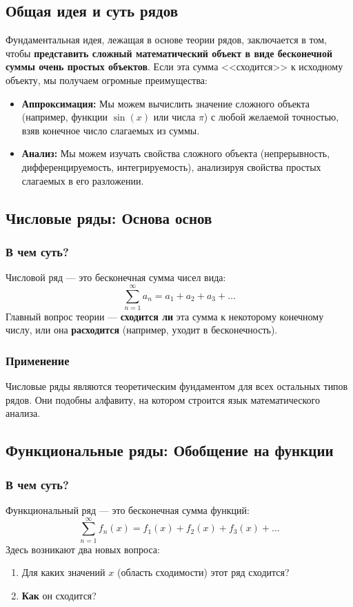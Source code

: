 \documentclass[a4paper, 12pt]{report}
\date{}
\numberwithin{equation}{section}
\begin{document}
\subsection{Общая идея и суть рядов}

Фундаментальная идея, лежащая в основе теории рядов, заключается в том, чтобы \textbf{представить сложный математический объект в виде бесконечной суммы очень простых объектов}. Если эта сумма <<сходится>> к исходному объекту, мы получаем огромные преимущества:
\begin{itemize}
	\item \textbf{Аппроксимация:} Мы можем вычислить значение сложного объекта (например, функции $\sin(x)$ или числа $\pi$) с любой желаемой точностью, взяв конечное число слагаемых из суммы.
	\item \textbf{Анализ:} Мы можем изучать свойства сложного объекта (непрерывность, дифференцируемость, интегрируемость), анализируя свойства простых слагаемых в его разложении.
\end{itemize}

\subsection{Числовые ряды: Основа основ}

\subsubsection{В чем суть?}
Числовой ряд — это бесконечная сумма чисел вида:
$$ \sum_{n=1}^{\infty} a_n = a_1 + a_2 + a_3 + \dots $$
Главный вопрос теории — \textbf{сходится ли} эта сумма к некоторому конечному числу, или она \textbf{расходится} (например, уходит в бесконечность).


\subsubsection{Применение}
Числовые ряды являются теоретическим фундаментом для всех остальных типов рядов. Они подобны алфавиту, на котором строится язык математического анализа.

\subsection{Функциональные ряды: Обобщение на функции}

\subsubsection{В чем суть?}
Функциональный ряд — это бесконечная сумма функций:
$$ \sum_{n=1}^{\infty} f_n(x) = f_1(x) + f_2(x) + f_3(x) + \dots $$
Здесь возникают два новых вопроса:
\begin{enumerate}
	\item Для каких значений $x$ (область сходимости) этот ряд сходится?
	\item \textbf{Как} он сходится?
\end{enumerate}
\end{document}
